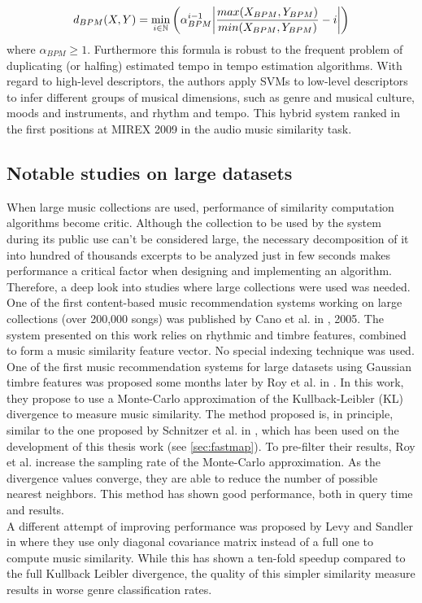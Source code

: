 \begin{equation}
d_{BPM}(X,Y) = \min_{i \in \mathbb{N}} \left( \alpha_{BPM}^{i-1} \abs*{\frac{max(X_{BPM}, Y_{BPM})}{min(X_{BPM}, Y_{BPM})} - i} \right)
\label{eq:bpmdistance}
\end{equation}
where $\alpha_{BPM} \geq 1$. Furthermore this formula is robust to the frequent problem of duplicating (or halfing) estimated tempo in tempo estimation algorithms. With regard to high-level descriptors, the authors apply SVMs to low-level descriptors to infer different groups of musical dimensions, such as genre and musical culture, moods and instruments, and rhythm and tempo. This hybrid system ranked in the first positions at MIREX 2009 in the audio music similarity task. 

\subsection*{Notable studies on large datasets}
When large music collections are used, performance of similarity computation algorithms become critic. Although the collection to be used by the system during its public use can't be considered large, the necessary decomposition of it into hundred of thousands excerpts to be analyzed just in few seconds makes performance a critical factor when designing and implementing an algorithm. Therefore, a deep look into studies where large collections were used was needed.\\
One of the first content-based music recommendation systems working on large collections (over 200,000 songs) was published by Cano et al. in \cite{cano05}, 2005. The system presented on this work relies on rhythmic and timbre features, combined to form a music similarity feature vector. No special indexing technique was used. \\
One of the first music recommendation systems for large datasets using Gaussian timbre features was proposed some months later by Roy et al. in \cite{roy05}. In this work, they propose to use a Monte-Carlo approximation of the Kullback-Leibler (KL) divergence to measure music similarity. The method proposed is, in principle, similar to the one proposed by Schnitzer et al. in \cite{fastmap12}, which has been used on the development of this thesis work (see \ref{sec:fastmap}). To pre-filter their results, Roy et al. increase the sampling rate of the Monte-Carlo approximation. As the divergence values converge, they are able to reduce the number of possible nearest neighbors. This method has shown good performance, both in query time and results.\\
A different attempt of improving performance was proposed by Levy and Sandler in \cite{levy06} where they use only diagonal covariance matrix instead of a full one to compute music similarity. While this has shown a ten-fold speedup compared to the full Kullback Leibler divergence, the quality of this simpler similarity measure results in worse genre classification rates. 


